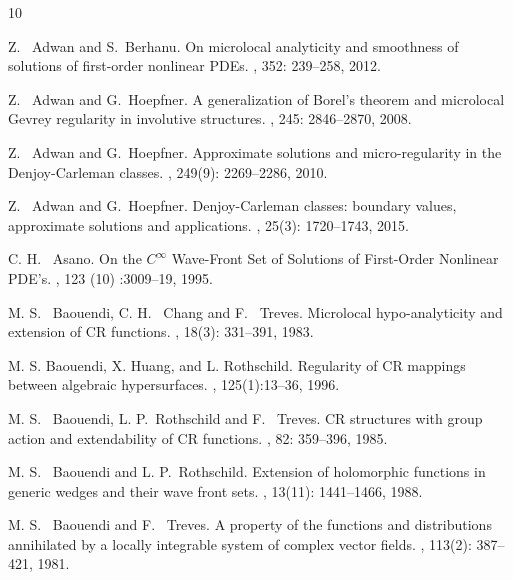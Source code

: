 \documentclass[11pt]{amsart}
\theoremstyle{definition}
\theoremstyle{remark}
\theoremstyle{plain}
\begin{document}
\begin{thebibliography}{10}

Z. ~Adwan and S.~Berhanu.
\newblock On microlocal analyticity and smoothness of solutions of first-order nonlinear PDEs.
, 352: 239--258, 2012.

Z. ~Adwan and G.~Hoepfner.
\newblock A generalization of Borel's theorem and microlocal Gevrey regularity in involutive structures.
, 245: 2846--2870, 2008.

Z. ~Adwan and G.~Hoepfner.
\newblock Approximate solutions and micro-regularity in the Denjoy-Carleman classes.
, 249(9): 2269--2286, 2010.

Z. ~Adwan and G.~Hoepfner.
\newblock Denjoy-Carleman classes: boundary values, approximate solutions and applications.
, 25(3): 1720--1743, 2015.

C. H. ~Asano.
\newblock On the $C^\infty$ Wave-Front Set of Solutions of First-Order Nonlinear PDE's.
, 123 (10) :3009--19, 1995.    

M. S. ~Baouendi, C. H. ~Chang and F. ~Treves.
\newblock Microlocal hypo-analyticity and extension of CR functions.
, 18(3): 331--391, 1983.

	M. S. Baouendi, X. Huang, and L. Rothschild.
  \newblock Regularity of CR mappings between algebraic hypersurfaces.
  , 125(1):13–36, 1996.


M. S. ~Baouendi, L. P.~Rothschild and F. ~Treves.
\newblock CR structures with group action and extendability of CR functions.
, 82: 359--396, 1985.

M. S. ~Baouendi and L. P.~Rothschild. 
\newblock Extension of holomorphic functions in generic wedges and their wave front sets.
, 13(11): 1441--1466, 1988.

M. S. ~Baouendi  and F. ~Treves.
\newblock A property of the functions and distributions annihilated by a locally integrable system of complex vector fields.
, 113(2): 387--421, 1981.


\end{thebibliography}
\end{document}
